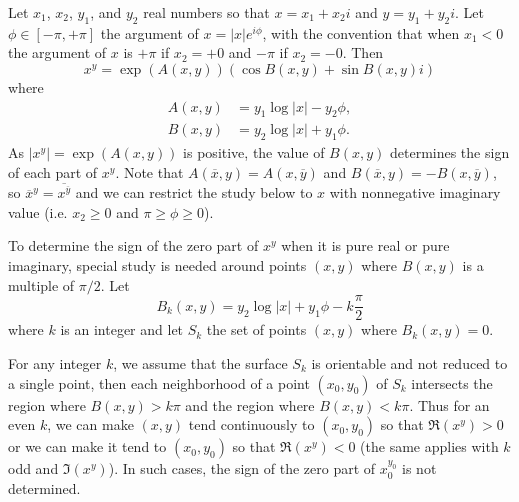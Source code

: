 \documentclass {article}
\renewcommand {\geq}{\geqslant}
\begin{document}
Let $x_1$, $x_2$, $y_1$, and $y_2$ real numbers so that $x = x_1 + x_2 i$ and
$y = y_1 + y_2 i$.
Let $\phi \in [-\pi, +\pi]$ the argument of $x = |x| e^{i\phi}$, with the
convention that when $x_1 < 0$ the argument of $x$ is $+\pi$ if $x_2 = +0$ and
$-\pi$ if $x_2 = -0$.
Then
\[
x^y=\exp\left(A(x,y)\right) \left(\cos B(x,y)+\sin B(x,y) i\right)
\] where
\begin {align*}
  A(x,y) & =  y_1\log|x|-y_2\phi,\\
  B(x,y) & =  y_2\log|x|+y_1\phi.
\end {align*}
As $|x^y| = \exp\left(A(x,y)\right)$ is positive, the value of $B(x,y)$
determines the sign of each part of $x^y$.
Note that $A(\overline{x},y) = A(x,\overline{y})$ and $B(\overline{x},
y)=-B(x,\overline{y})$, so $\overline{x}^y = \overline{x^{\overline{y}}}$ and
we can restrict the study below to $x$ with nonnegative imaginary value
(i.e. $x_2 \geq 0$ and $\pi \geq \phi \geq 0$).

To determine the sign of the zero part of $x^y$ when it is pure real or pure
imaginary, special study is needed around points $(x, y)$ where $B(x, y)$ is a
multiple of $\pi/2$.
Let
\begin {equation}
  \label {eqn:Bk}
  B_k(x, y) = y_2 \log|x| +y_1\phi -k\frac{\pi}{2}
\end {equation}
where $k$ is an integer and let $S_k$ the set of points $(x, y)$ where $B_k(x,
y) = 0$.

For any integer $k$, we assume that the surface $S_k$ is orientable and not
reduced to a single point, then each neighborhood of a point $(x_0, y_0)$ of
$S_k$ intersects the region where $B(x, y) > k\pi$ and the region where $B(x,
y) < k\pi$.
Thus for an even $k$, we can make $(x, y)$ tend continuously to $(x_0, y_0)$
so that $\Re(x^y) > 0$ or we can make it tend to $(x_0, y_0)$ so that
$\Re(x^y) < 0$ (the same applies with $k$ odd and $\Im(x^y)$).
In such cases, the sign of the zero part of $x_0^{y_0}$ is not determined.
\end{document}
